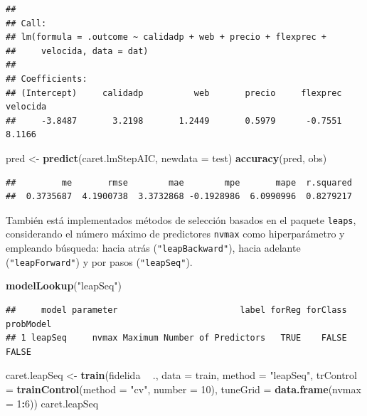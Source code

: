 \documentclass[
  spanish,
]{book}
\newenvironment{Shaded}{\begin{snugshade}}{\end{snugshade}}
\newcommand{\DataTypeTok}[1]{\textcolor[rgb]{0.13,0.29,0.53}{#1}}
\newcommand{\DecValTok}[1]{\textcolor[rgb]{0.00,0.00,0.81}{#1}}
\newcommand{\KeywordTok}[1]{\textcolor[rgb]{0.13,0.29,0.53}{\textbf{#1}}}
\newcommand{\NormalTok}[1]{#1}
\newcommand{\OperatorTok}[1]{\textcolor[rgb]{0.81,0.36,0.00}{\textbf{#1}}}
\newcommand{\StringTok}[1]{\textcolor[rgb]{0.31,0.60,0.02}{#1}}
\theoremstyle{break}
\theoremstyle{definition}
\theoremstyle{definition}
\theoremstyle{definition}
\theoremstyle{remark}
\begin{document}
\begin{verbatim}
## 
## Call:
## lm(formula = .outcome ~ calidadp + web + precio + flexprec + 
##     velocida, data = dat)
## 
## Coefficients:
## (Intercept)     calidadp          web       precio     flexprec     velocida  
##     -3.8487       3.2198       1.2449       0.5979      -0.7551       8.1166
\end{verbatim}

\begin{Shaded}
\begin{Highlighting}[]
\NormalTok{pred <-}\StringTok{ }\KeywordTok{predict}\NormalTok{(caret.lmStepAIC, }\DataTypeTok{newdata =}\NormalTok{ test)}
\KeywordTok{accuracy}\NormalTok{(pred, obs)}
\end{Highlighting}
\end{Shaded}

\begin{verbatim}
##         me       rmse        mae        mpe       mape  r.squared 
##  0.3735687  4.1900738  3.3732868 -0.1928986  6.0990996  0.8279217
\end{verbatim}

También está implementados métodos de selección basados en el paquete \texttt{leaps}, considerando el número máximo de predictores \texttt{nvmax} como hiperparámetro y empleando búsqueda: hacia atrás (\texttt{"leapBackward"}), hacia adelante (\texttt{"leapForward"}) y por pasos (\texttt{"leapSeq"}).

\begin{Shaded}
\begin{Highlighting}[]
\KeywordTok{modelLookup}\NormalTok{(}\StringTok{"leapSeq"}\NormalTok{)}
\end{Highlighting}
\end{Shaded}

\begin{verbatim}
##     model parameter                        label forReg forClass probModel
## 1 leapSeq     nvmax Maximum Number of Predictors   TRUE    FALSE     FALSE
\end{verbatim}

\begin{Shaded}
\begin{Highlighting}[]
\NormalTok{caret.leapSeq <-}\StringTok{ }\KeywordTok{train}\NormalTok{(fidelida }\OperatorTok{~}\StringTok{ }\NormalTok{., }\DataTypeTok{data =}\NormalTok{ train, }\DataTypeTok{method =} \StringTok{"leapSeq"}\NormalTok{,}
                   \DataTypeTok{trControl =} \KeywordTok{trainControl}\NormalTok{(}\DataTypeTok{method =} \StringTok{"cv"}\NormalTok{, }\DataTypeTok{number =} \DecValTok{10}\NormalTok{),}
                   \DataTypeTok{tuneGrid =} \KeywordTok{data.frame}\NormalTok{(}\DataTypeTok{nvmax =} \DecValTok{1}\OperatorTok{:}\DecValTok{6}\NormalTok{))}
\NormalTok{caret.leapSeq}
\end{Highlighting}
\end{Shaded}
\end{document}
